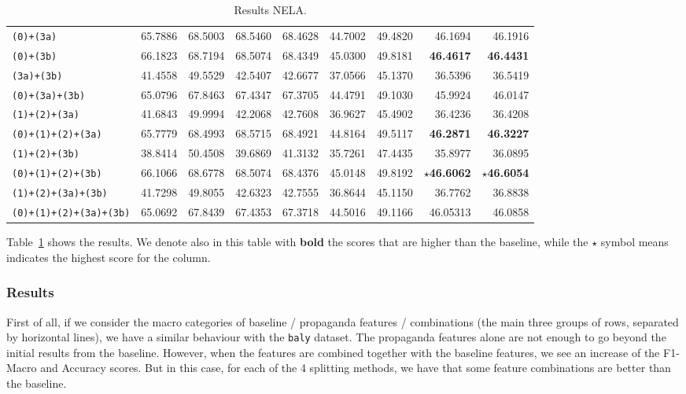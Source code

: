 \begin{table}[!htbp]
{\begin{tabular}{l|rr|rr|rr|rr}
        \texttt{(0)+(3a)} & 65.7886 & 68.5003 & 68.5460 & 68.4628 & 44.7002 & 49.4820 & 46.1694 & 46.1916 \\
        \texttt{(0)+(3b)} & 66.1823 & 68.7194 & 68.5074 & 68.4349 & 45.0300 & 49.8181 & \textbf{46.4617} & \textbf{46.4431} \\
        \texttt{(3a)+(3b)} & 41.4558 & 49.5529 & 42.5407 & 42.6677 & 37.0566 & 45.1370 & 36.5396 & 36.5419 \\
        \texttt{(0)+(3a)+(3b)} & 65.0796 & 67.8463 & 67.4347 & 67.3705 & 44.4791 & 49.1030 & 45.9924 & 46.0147  \\
        \texttt{(1)+(2)+(3a)} & 41.6843 & 49.9994 & 42.2068 & 42.7608 & 36.9627 & 45.4902 & 36.4236 & 36.4208   \\
        \texttt{(0)+(1)+(2)+(3a)} & 65.7779 & 68.4993 & 68.5715 & 68.4921 & 44.8164 & 49.5117 & \textbf{46.2871} & \textbf{46.3227}  \\
        \texttt{(1)+(2)+(3b)} & 38.8414 & 50.4508 & 39.6869 & 41.3132 & 35.7261 & 47.4435 & 35.8977 & 36.0895  \\
        \texttt{(0)+(1)+(2)+(3b)} & 66.1066 & 68.6778 & 68.5074 & 68.4376 & 45.0148 & 49.8192 & \textbf{$\star$46.6062} & \textbf{$\star$46.6054} \\
        \texttt{(1)+(2)+(3a)+(3b)} & 41.7298 & 49.8055 & 42.6323 & 42.7555 & 36.8644 & 45.1150 & 36.7762 & 36.8838 \\
        \texttt{(0)+(1)+(2)+(3a)+(3b)} & 65.0692 & 67.8439 & 67.4353 & 67.3718 & 44.5016 & 49.1166 & 46.05313 & 46.0858  \\
        
    \end{tabular}
    }
    \caption{Results NELA.}
    \label{tab:results_prop_features_classifier_nela}
\end{table}

Table~\ref{tab:results_prop_features_classifier_nela} shows the results. We denote also in this table with \textbf{bold} the scores that are higher than the baseline, while the $\star$ symbol means indicates the highest score for the column.

\subsubsection{Results}

First of all, if we consider the macro categories of baseline / propaganda features / combinations (the main three groups of rows, separated by horizontal lines), we have a similar behaviour with the \texttt{baly} dataset. The propaganda features alone are not enough to go beyond the initial results from the baseline. However, when the features are combined together with the baseline features, we see an increase of the F1-Macro and Accuracy scores.
But in this case, for each of the 4 splitting methods, we have that some feature combinations are better than the baseline.

